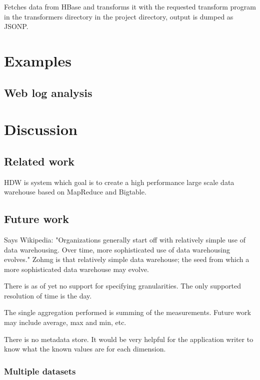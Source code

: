\documentclass[a4paper,10pt]{book}
\begin{document}
Fetches data from HBase and transforms it with the requested transform
program in the transformers directory in the project directory, output is
dumped as JSONP.



\chapter{Examples}

\section{Web log analysis}



\chapter{Discussion}

\section{Related work}

HDW is system which goal is to create a high performance large scale data
warehouse based on MapReduce and Bigtable. \cite{hdw}



\section{Future work}

Says Wikipedia: "Organizations generally start off with relatively simple use of data warehousing. Over time, more sophisticated use of data warehousing evolves." Zohmg is that relatively simple data warehouse; the seed from which a more sophisticated data warehouse may evolve.

There is as of yet no support for specifying granularities. The only supported resolution of time is the day.

The single aggregation performed is summing of the measurements. Future work may include average, max and min, etc.

There is no metadata store. It would be very helpful for the application writer to know what the known values are for each dimension.

\subsection{Multiple datasets}
\end{document}
